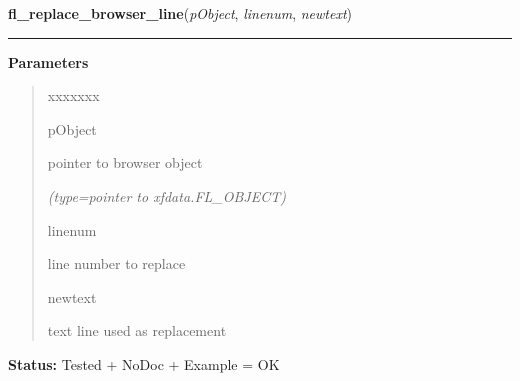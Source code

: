 \hspace{.8\funcindent}\begin{boxedminipage}{\funcwidth}

    \raggedright \textbf{fl\_replace\_browser\_line}(\textit{pObject}, \textit{linenum}, \textit{newtext})

    \vspace{-1.5ex}

    \rule{\textwidth}{0.5\fboxrule}
\setlength{\parskip}{2ex}
\setlength{\parskip}{1ex}
      \textbf{Parameters}
      \vspace{-1ex}

      \begin{quote}
        \begin{Ventry}{xxxxxxx}

          \item[pObject]

          pointer to browser object

            {\it (type=pointer to xfdata.FL\_OBJECT)}

          \item[linenum]

          line number to replace

          \item[newtext]

          text line used as replacement

        \end{Ventry}

      \end{quote}

\textbf{Status:} Tested + NoDoc + Example = OK



    \end{boxedminipage}

    \label{xformslib:library:fl_get_browser_line}

    \vspace{0.5ex}

